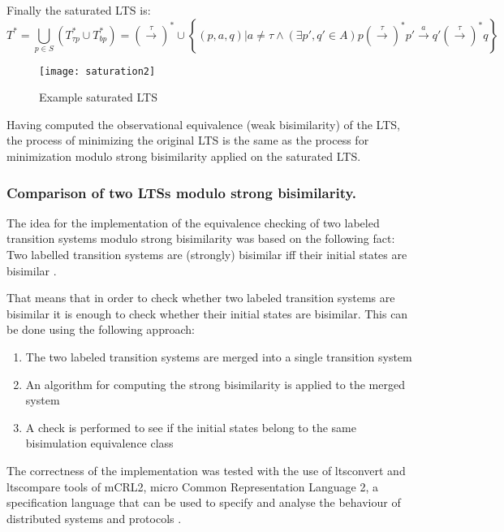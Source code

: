 Finally the saturated LTS is:
\begin{equation*}
	T^{*}=\bigcup_{p\in S}\left(T^{*}_{\tau p}\cup T^{*}_{bp}\right)=\left(\stackrel{\tau}{\rightarrow}\right)^{*}\cup\left\{\left(p,a,q\right)|a\neq\tau\wedge\left(\exists p',q'\in A\right) p\left(\stackrel{\tau}{\rightarrow}\right)^{*}p'\stackrel{a}{\rightarrow}q'\left(\stackrel{\tau}{\rightarrow}\right)^{*}q\right\}
\end{equation*}

\begin{figure}[!ht]
\centering
\texttt{[image: saturation2]}
\caption{Example saturated LTS}
\label{fig:saturation2}
\end{figure}

Having computed the observational equivalence (weak bisimilarity) of the LTS, the process of minimizing the original LTS is the same as the process for minimization modulo strong bisimilarity applied on the saturated LTS.

\subsubsection{Comparison of two LTSs modulo strong bisimilarity.}
The idea for the implementation of the equivalence checking of two labeled transition systems modulo strong bisimilarity was based on the following fact: Two labelled transition systems are (strongly) bisimilar iff their initial states are bisimilar \cite{ModellingAndAnalysis}.

That means that in order to check whether two labeled transition systems are bisimilar it is enough to check whether their initial states are bisimilar. This can be done using the following approach:
\begin{enumerate}
	\item The two labeled transition systems are merged into a single transition system
	\item An algorithm for computing the strong bisimilarity is applied to the merged system
	\item A check is performed to see if the initial states belong to the same bisimulation equivalence class
\end{enumerate}

The correctness of the implementation was tested with the use of ltsconvert and ltscompare tools of mCRL2, micro Common Representation Language 2, a specification language that can be used to specify and analyse the behaviour of distributed systems and protocols
\cite{mCRL2Ref}.

